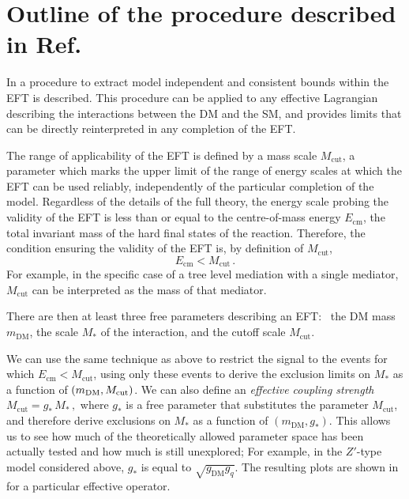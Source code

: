 \clearpage

\section{Outline of the procedure described in Ref.~\cite{Racco:2015dxa}}

In \cite{Racco:2015dxa} a procedure to extract model independent and consistent bounds within the EFT is described. This procedure can be applied to any effective Lagrangian describing the interactions between the DM and the SM, and provides limits that can be directly reinterpreted in any completion of the EFT.

The range of applicability of the EFT is defined by a mass scale $M_\text{cut}$, a parameter which marks the upper limit of the range of energy scales at which the EFT can be used reliably, independently of the particular completion of the model. 
Regardless of the  details of the full theory, the energy scale probing the validity of the EFT is less than or equal to the centre-of-mass energy $E_\text{cm}$, 
the total invariant mass of the hard final states of the reaction.
Therefore, the condition ensuring the validity of the EFT is, by definition of $M_\text{cut}$,
\begin{equation}
\label{Ecm<Mcut}
E_\text{cm}<M_\text{cut}\,.
\end{equation}
For example, in the specific case of a tree level mediation with a single mediator, $M_\text{cut}$ can be interpreted as the mass of that mediator.

There are then at least three free parameters describing an EFT:~ 
the DM mass $m_\text{DM}$, the scale $M_*$ of the interaction, and the cutoff scale $M_\text{cut}$.

We can use the same technique as above to restrict the signal to the events for which $E_\text{cm}<M_\text{cut}$,  using only these events to derive the exclusion limits on $M_*$ as a function of  $(m_\text{DM},M_{\rm cut})$. 
%
We can also define an \textit{effective coupling strength} $M_\text{cut}=g_* \, M_*\,,$ where $g_*$ is a free parameter that substitutes the parameter $M_\text{cut}$, and therefore derive exclusions on $M_*$ as a function of $(m_\text{DM},g_*)$. This allows us to see how much of the theoretically allowed parameter space has been actually tested and how much is still unexplored; For example, in the $Z'$-type model considered above, $g_*$ is equal to $\sqrt{g_\text{DM}g_q}$.
%
The resulting plots are shown in \cite{Racco:2015dxa} for a particular effective operator. 

